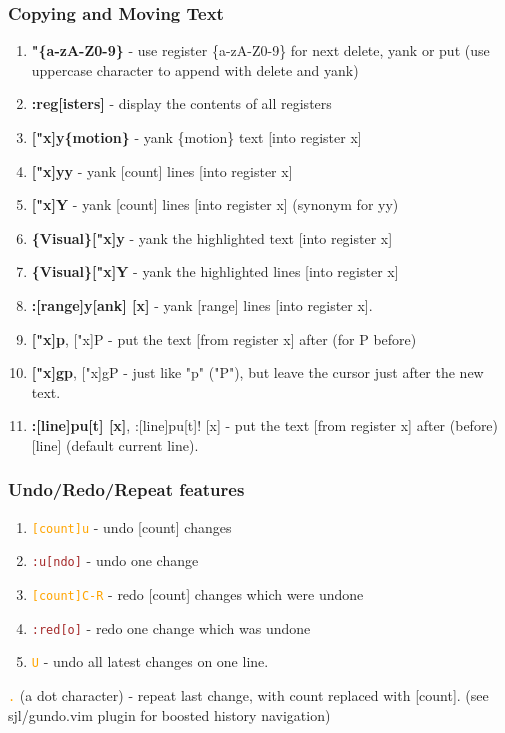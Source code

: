 \documentclass{beamer}
\newcommand{\vimnormal}[1]{\texttt{\textcolor{orange}{#1}}}
\newcommand{\vimcommand}[1]{\texttt{\textcolor{brown}{#1}}}
\begin{document}
\begin{frame}
    \frametitle{Copying and Moving Text}
    \begin{enumerate}
        \item \textbf{"\{a-zA-Z0-9\}} - use register \{a-zA-Z0-9\} for next delete, yank or put (use uppercase character to append with delete and yank)
        \item \textbf{:reg[isters]} - display the contents of all registers
        \item \textbf{["x]y\{motion\}} - yank \{motion\} text [into register x]
        \item \textbf{["x]yy} - yank [count] lines [into register x]
        \item \textbf{["x]Y} - yank [count] lines [into register x] (synonym for yy)
        \item \textbf{\{Visual\}["x]y} - yank the highlighted text [into register x]
        \item \textbf{\{Visual\}["x]Y} - yank the highlighted lines [into register x]
        \item \textbf{:[range]y[ank] [x]} - yank [range] lines [into register x].
        \item \textbf{["x]p}, ["x]P - put the text [from register x] after (for P before)
        \item \textbf{["x]gp}, ["x]gP - just like "p" ("P"), but leave the cursor just after the new text.
        \item \textbf{:[line]pu[t] [x]}, :[line]pu[t]! [x] - put the text [from register x] after (before) [line] (default current line).
    \end{enumerate}
\end{frame}

\begin{frame}
    \frametitle{Undo/Redo/Repeat features}
    \begin{enumerate}
        \item \vimnormal{[count]u}   - undo [count] changes
        \item \vimcommand{:u[ndo]}    - undo one change
        \item \vimnormal{[count]C-R} - redo [count] changes which were undone
        \item \vimcommand{:red[o]}    - redo one change which was undone
        \item \vimnormal{U}          - undo all latest changes on one line.
    \end{enumerate}
    \vimnormal{.} (a dot character) - repeat last change, with count replaced with [count].
    (see sjl/gundo.vim plugin for boosted history navigation)
\end{frame}
\end{document}
